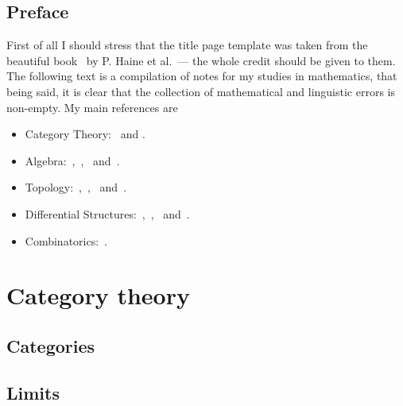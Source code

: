 


\frontmatter

% 
\maketitle

\tableofcontents
\listoftodos

\pagestyle{plain}

\chapter{Preface}

First of all I should stress that the title page template was taken from the
beautiful book~\cite{Haine21DiffCoho} by P. Haine et al.~--- the whole credit
should be given to them. The following text is a compilation of notes for my
studies in mathematics, that being said, it is clear that the collection of
mathematical and linguistic errors is non-empty. My main references are
\begin{itemize}\setlength\itemsep{0em}
\item Category Theory:~\cite{Rie16} and \cite{Shap06}.
\item Algebra:~\cite{Yu89},~\cite{Kim20},~\cite{Aluf09} and~\cite{Lang93}.
\item Topology:~\cite{Lee11},~\cite{Tai20},~\cite{Mun00} and~\cite{Eng89}.
\item Differential Structures:~\cite{Zor15},~\cite{Zor16},~\cite{Rud76}
  and~\cite{Jost06}.
\item Combinatorics:~\cite{Die16}.
\end{itemize}

\mainmatter

\part{Category theory}

\chapter{Categories}





\chapter{Limits}

